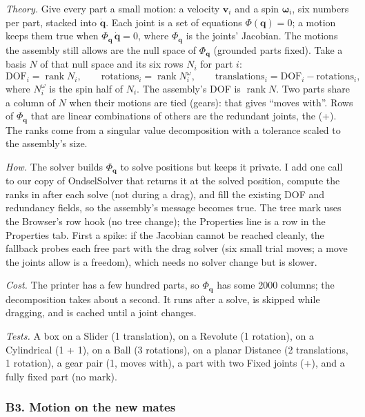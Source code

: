 \emph{Theory.} Give every part a small motion: a velocity $\mathbf v_i$ and a spin $\boldsymbol\omega_i$, six
numbers per part, stacked into $\dot{\mathbf q}$. Each joint is a set of equations $\Phi(\mathbf q)=0$; a motion
keeps them true when $\Phi_{\mathbf q}\,\dot{\mathbf q}=0$, where $\Phi_{\mathbf q}$ is the joints' Jacobian.
The motions the assembly still allows are the null space of $\Phi_{\mathbf q}$ (grounded parts fixed). Take a basis
$N$ of that null space and its six rows $N_i$ for part $i$:
\[
  \mathrm{DOF}_i=\operatorname{rank} N_i,\qquad \text{rotations}_i=\operatorname{rank} N_i^{\omega},\qquad
  \text{translations}_i=\mathrm{DOF}_i-\text{rotations}_i ,
\]
where $N_i^{\omega}$ is the spin half of $N_i$. The assembly's DOF is $\operatorname{rank} N$. Two parts share a
column of $N$ when their motions are tied (gears): that gives ``moves with''. Rows of $\Phi_{\mathbf q}$ that are
linear combinations of others are the redundant joints, the (+). The ranks come from a singular value
decomposition with a tolerance scaled to the assembly's size.

\emph{How.} The solver builds $\Phi_{\mathbf q}$ to solve positions but keeps it private. I add one call to our
copy of OndselSolver that returns it at the solved position, compute the ranks in  after
each solve (not during a drag), and fill the existing DOF and redundancy fields, so the assembly's message becomes
true. The tree mark uses the Browser's row hook (no tree change); the Properties line is a row in the Properties
tab. First a spike: if the Jacobian cannot be reached cleanly, the fallback probes each free part with the drag
solver (six small trial moves; a move the joints allow is a freedom), which needs no solver change but is slower.

\emph{Cost.} The printer has a few hundred parts, so $\Phi_{\mathbf q}$ has some 2000 columns; the decomposition
takes about a second. It runs after a solve, is skipped while dragging, and is cached until a joint changes.

\emph{Tests.} A box on a Slider (1 translation), on a Revolute (1 rotation), on a Cylindrical (1 + 1), on a
Ball (3 rotations), on a planar Distance (2 translations, 1 rotation), a gear pair (1, moves with), a part with
two Fixed joints (+), and a fully fixed part (no mark).

\subsubsection*{B3. Motion on the new mates}


